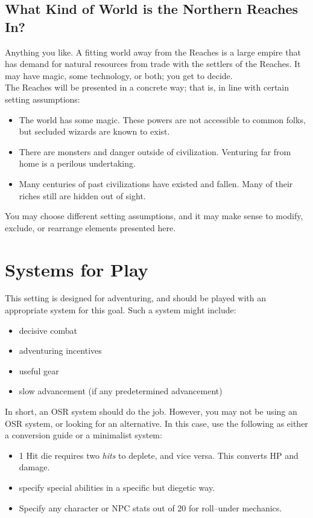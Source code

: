 \documentclass[notitlepage]{article}
\begin{document}
\begin{multicols}{2}
\subsection*{What Kind of World is the Northern Reaches In?}

Anything you like.
A fitting world away from the Reaches is a large empire that has demand for natural resources from trade with the settlers of the Reaches.
It may have magic, some technology, or both; you get to decide. \\

The Reaches will be presented in a concrete way; that is, in line with certain setting assumptions:

\begin{itemize}
\item The world has some magic. These powers are not accessible to common folks, but secluded wizards are known to exist.
\item There are monsters and danger outside of civilization. Venturing far from home is a perilous undertaking.
\item Many centuries of past civilizations have existed and fallen. Many of their riches still are hidden out of sight. 
\end{itemize}

You may choose different setting assumptions, and it may make sense to modify, exclude, or rearrange elements presented here.


\section{Systems for Play}

This setting is designed for adventuring, and should be played with an appropriate system for this goal.
Such a system might include:

\begin{itemize}
\item decisive combat
\item adventuring incentives
\item useful gear
\item slow advancement (if any predetermined advancement)
\end{itemize}

In short, an OSR system should do the job.
However, you may not be using an OSR system, or looking for an alternative.
In this case, use the following as either a conversion guide or a minimalist system:

\begin{itemize}
\item 1 Hit die requires two \emph{hits} to deplete, and vice versa. This converts HP and damage.
\item specify special abilities in a specific but diegetic way.
\item Specify any character or NPC stats out of 20 for roll--under mechanics.
\end{itemize}


\end{multicols}
\end{document}
